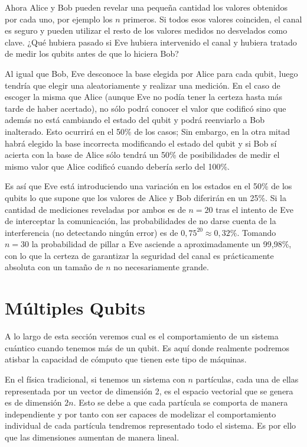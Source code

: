 Ahora Alice y Bob pueden revelar una pequeña cantidad los valores obtenidos por cada uno, por ejemplo los $n$ primeros. Si todos esos valores coinciden, el canal es seguro y pueden utilizar el resto de los valores medidos no desvelados como clave. ¿Qué hubiera pasado si Eve hubiera intervenido el canal y hubiera tratado de medir los qubits antes de que lo hiciera Bob?

Al igual que Bob, Eve desconoce la base elegida por Alice para cada qubit, luego tendría que elegir una aleatoriamente  y realizar una medición. En el caso de escoger la misma que Alice (aunque Eve no podía tener la certeza hasta más tarde de haber acertado), no sólo podrá conocer el valor que codificó sino que además no está cambiando el estado del qubit y podrá reenviarlo a Bob inalterado. Esto ocurrirá en el 50\% de los casos; Sin embargo, en la otra mitad habrá elegido la base incorrecta modificando el estado del qubit y si Bob sí acierta con la base de Alice sólo tendrá un 50\% de posibilidades de medir el mismo valor que Alice codificó cuando debería serlo del 100\%.

Es así que Eve está introduciendo una variación en los estados en el 50\% de los qubits lo que supone que los valores de Alice y Bob diferirán en un 25\%. Si la cantidad de mediciones reveladas por ambos es de $n=20$ tras el intento de Eve de interceptar la comunicación, las probabilidades de no darse cuenta de la interferencia (no detectando ningún error) es de $0,75^{20}\approx0,32\%$. Tomando $n=30$ la probabilidad de pillar a Eve asciende a aproximadamente un 99,98\%, con lo que la certeza de garantizar la seguridad del canal es prácticamente absoluta con un tamaño de $n$ no necesariamente grande.

\section{Múltiples Qubits}

A lo largo de esta sección veremos cual es el comportamiento de un sistema cuántico cuando tenemos más de un qubit. Es aquí donde realmente podremos atisbar la capacidad de cómputo que tienen este tipo de máquinas.

En el física tradicional, si tenemos un sistema con $n$ partículas, cada una de ellas representada por un vector de dimensión 2, es el espacio vectorial que se genera es de dimensión $2n$. Esto se debe a que cada partícula se comporta de manera independiente y por tanto con ser capaces de modelizar el comportamiento individual de cada partícula tendremos representado todo el sistema. Es por ello que las dimensiones aumentan de manera lineal.

